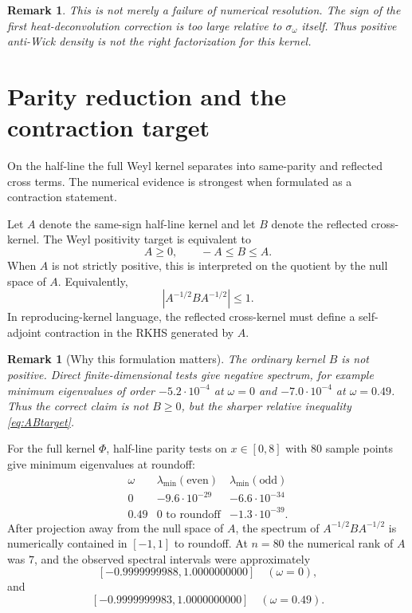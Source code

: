 \documentclass[11pt]{article}
\newtheorem{remark}[theorem]{Remark}
\begin{document}
\begin{remark}
This is not merely a failure of numerical resolution.  The sign of the first
heat-deconvolution correction is too large relative to $\sigma_\omega$ itself.
Thus positive anti-Wick density is not the right factorization for this
kernel.
\end{remark}

\section{Parity reduction and the contraction target}

On the half-line the full Weyl kernel separates into same-parity and reflected
cross terms.  The numerical evidence is strongest when formulated as a
contraction statement.

Let $A$ denote the same-sign half-line kernel and let $B$ denote the reflected
cross-kernel.  The Weyl positivity target is equivalent to
\begin{equation}
       A\ge 0,\qquad -A\le B\le A.
       \label{eq:ABtarget}
\end{equation}
When $A$ is not strictly positive, this is interpreted on the quotient by the
null space of $A$.  Equivalently,
\begin{equation}
       |A^{-1/2}BA^{-1/2}|\le 1.
       \label{eq:contraction}
\end{equation}
In reproducing-kernel language, the reflected cross-kernel must define a
self-adjoint contraction in the RKHS generated by $A$.

\begin{remark}[Why this formulation matters]
The ordinary kernel $B$ is not positive.  Direct finite-dimensional tests give
negative spectrum, for example minimum eigenvalues of order
$-5.2\cdot 10^{-4}$ at $\omega=0$ and $-7.0\cdot 10^{-4}$ at
$\omega=0.49$.  Thus the correct claim is not $B\ge 0$, but the sharper
relative inequality \eqref{eq:ABtarget}.
\end{remark}

For the full kernel $\Phi$, half-line parity tests on $x\in[0,8]$ with
$80$ sample points give minimum eigenvalues at roundoff:
\[
\begin{array}{c|cc}
\omega & \lambda_{\min}(\text{even}) & \lambda_{\min}(\text{odd})\\
\hline
0      & -9.6\cdot 10^{-29} & -6.6\cdot 10^{-34}\\
0.49   & 0\text{ to roundoff} & -1.3\cdot 10^{-39}.
\end{array}
\]
After projection away from the null space of $A$, the spectrum of
$A^{-1/2}BA^{-1/2}$ is numerically contained in $[-1,1]$ to roundoff.  At
$n=80$ the numerical rank of $A$ was $7$, and the observed spectral intervals
were approximately
\[
  [-0.9999999988,1.0000000000]\quad(\omega=0),
\]
and
\[
  [-0.9999999983,1.0000000000]\quad(\omega=0.49).
\]
\end{document}
